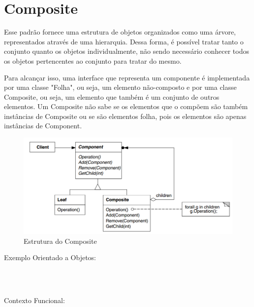 \section{Composite}

Esse padrão fornece uma estrutura de objetos organizados como uma 
árvore, representados através de uma hierarquia. Dessa forma, é 
possível tratar tanto o conjunto quanto os objetos individualmente, 
não sendo necessário conhecer todos os objetos pertencentes ao conjunto 
para tratar do mesmo.

Para alcançar isso, uma interface que representa um componente é 
implementada por uma classe "Folha", ou seja, um elemento não-composto 
e por uma classe Composite, ou seja, um elemento que também é um 
conjunto de outros elementos. Um Composite não sabe se os elementos 
que o compõem são também instâncias de Composite ou se são elementos 
folha, pois os elementos são apenas instâncias de Component.

\begin{figure}[htb]
	\caption{\label{fig_grafico}Estrutura do Composite}
	\begin{center}
	    \includegraphics[scale=0.5]{5_padroes-contexto-funcional/5.2_estruturais/5.2.3_composite/diagram.png}
	\end{center}
\end{figure}

Exemplo Orientado a Objetos:

\begin{lstlisting}[caption={Composite Orientado a Objetos},label=oocomposite]



\end{lstlisting}

Contexto Funcional:



\begin{lstlisting}[caption={Composite Funcional},label=fpcomposite]
    

    
\end{lstlisting}